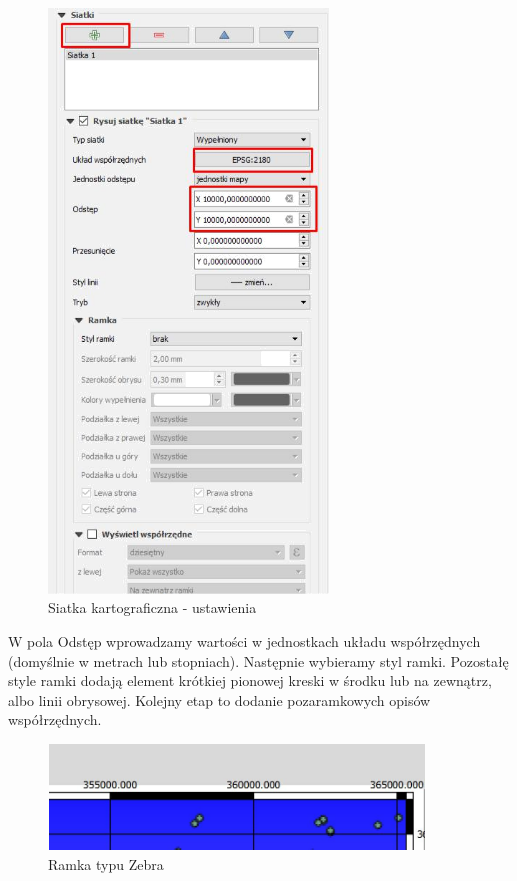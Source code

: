 \documentclass[12pt,a4paper]{book}
\begin{document}
\begin{center}
\begin{figure}
\includegraphics[height=15.5cm]{008-siatki.png}
\caption{Siatka kartograficzna - ustawienia}
\end{figure}
\end{center}
W pola Odstęp wprowadzamy wartości w jednostkach układu współrzędnych (domyślnie w metrach lub stopniach). Następnie wybieramy styl ramki. Pozostałę style ramki dodają element krótkiej pionowej kreski w środku lub na zewnątrz, albo linii obrysowej. Kolejny etap to dodanie pozaramkowych opisów współrzędnych.

\begin{center}
\begin{figure}
\includegraphics[width=9.998cm,height=2.808cm]{008-zebra.jpg}
\caption{Ramka typu Zebra}
\end{figure}
\end{center}
\end{document}
